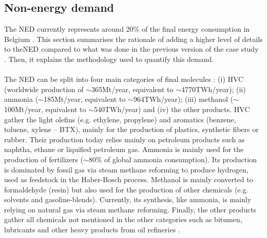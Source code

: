\subsection{Non-energy demand}
\label{subsec:cs:NED}
The \gls{NED} currently represents around 20\% of the final energy consumption in Belgium \cite{FPSEconomy2021}.  This section summarises the rationale of adding a higher level of details to the\gls{NED} compared to what was done in the previous version of the case study \cite{limpens2021generating}. Then, it explains the methodology used to quantify this demand.\\

\\

\noindent
The \gls{NED} can be split into four main categories of final molecules \cite{IEA2018_petrochemicals}: (i) \gls{HVC} (worldwide production of $\sim$365Mt/year, equivalent to $\sim$4770TWh/year); (ii) ammonia ($\sim$185Mt/year, equivalent to $\sim$964TWh/year); (iii) methanol ($\sim$100Mt/year, equivalent to $\sim$540TWh/year) and (iv) the other products. \Gls{HVC} gather the light olefins (e.g. ethylene, propylene) and aromatics (benzene, toluene, xylene – BTX), mainly for the production of plastics, synthetic fibers or rubber. Their production today relies mainly on petroleum products such as naphtha, ethane or liquified petroleum gas. Ammonia is  mainly used for the production of fertilizers ($\sim$80\% of global ammonia consumption). Its production is dominated by fossil gas via steam methane reforming to produce hydrogen, used as feedstock in the Haber-Bosch process. Methanol is mainly converted to formaldehyde (resin) but also used for the production of other chemicals (e.g. solvents and gasoline-blends). Currently, its synthesis, like ammonia, is mainly relying on natural gas via steam methane reforming. Finally, the other products gather all chemicals not mentioned in the other categories such as bitumen, lubricants and other heavy products from oil refineries \cite{daioglou2014energy}.\\

